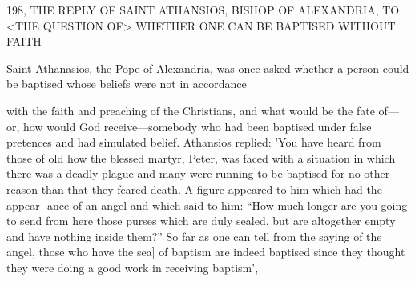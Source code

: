 198, THE REPLY OF SAINT ATHANSIOS,
BISHOP OF ALEXANDRIA,
TO <THE QUESTION OF> WHETHER
ONE CAN BE BAPTISED WITHOUT FAITH

Saint Athanasios, the Pope of Alexandria, was once asked whether
a person could be baptised whose beliefs were not in accordance

with the faith and preaching of the Christians, and what would be
the fate of—or, how would God receive—somebody who had been
baptised under false pretences and had simulated belief. Athansios
replied: 'You have heard from those of old how the blessed martyr,
Peter, was faced with a situation in which there was a deadly plague
and many were running to be baptised for no other reason than that
they feared death. A figure appeared to him which had the appear-
ance of an angel and which said to him: “How much longer are you
going to send from here those purses which are duly sealed, but are
altogether empty and have nothing inside them?” So far as one can
tell from the saying of the angel, those who have the sea] of baptism
are indeed baptised since they thought they were doing a good work
in receiving baptism',

